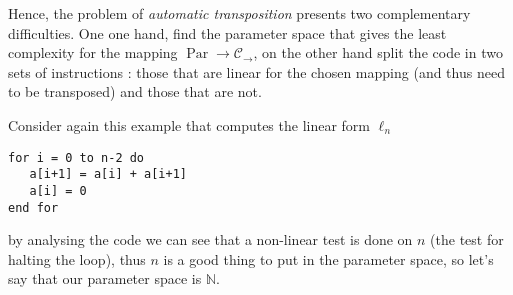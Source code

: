 \documentclass{article}
\newcommand{\cat}[1]{\mathscr{#1}}
\newcommand{\C}{\cat{C}}
\newcommand{\N}{\mathbb{N}}
\newcommand{\ra}{\rightarrow}
\DeclareMathOperator{\Par}{Par}
\begin{document}
  Hence, the problem of \emph{automatic transposition} presents two
  complementary difficulties. One one hand, find the parameter space
  that gives the least complexity for the mapping $\Par\ra\C_\ra$, on
  the other hand split the code in two sets of instructions : those
  that are linear for the chosen mapping (and thus need to be
  transposed) and those that are not.

  Consider again this example that computes the linear form $\ell_n$
  \begin{center}
    \begin{minipage}{0.7\textwidth}
\begin{verbatim}
for i = 0 to n-2 do
   a[i+1] = a[i] + a[i+1]
   a[i] = 0
end for
\end{verbatim}
    \end{minipage}
  \end{center}
  by analysing the code we can see that a non-linear test is done on
  $n$ (the test for halting the loop), thus $n$ is a good thing to put
  in the parameter space, so let's say that our parameter space is
  $\N$.
  
\end{document}
